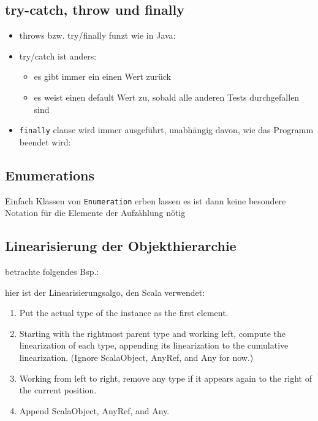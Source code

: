 \subsection{try-catch, throw und finally}
\begin{itemize}
  \item throws bzw. try/finally funzt wie in Java:
  
  
  
  \item try/catch ist anders:
  \begin{itemize}
    \item es gibt immer ein einen Wert zurück
    \item es weist einen default Wert zu, sobald alle anderen Tests
    durchgefallen sind
    
    
    
  \end{itemize}
  \item \texttt{finally} clause wird immer ausgeführt, unabhängig davon,
  wie das Programm beendet wird:
  
  
  
\end{itemize}


\subsection{Enumerations}
Einfach Klassen von \texttt{Enumeration} erben lassen \und es ist dann
keine besondere Notation für die Elemente der Aufzählung nötig




\subsection{Linearisierung der Objekthierarchie}
betrachte folgendes Bsp.:




hier ist der Linearisierungsalgo, den Scala verwendet:

\begin{enumerate}
  \item Put the actual type of the instance as the first element.
  \item Starting with the rightmost parent type and working left, compute the linearization
of each type, appending its linearization to the cumulative linearization. (Ignore
ScalaObject, AnyRef, and Any for now.)
  \item Working from left to right, remove any type if it appears again to the right of the
current position.
  \item Append ScalaObject, AnyRef, and Any.
\end{enumerate}


